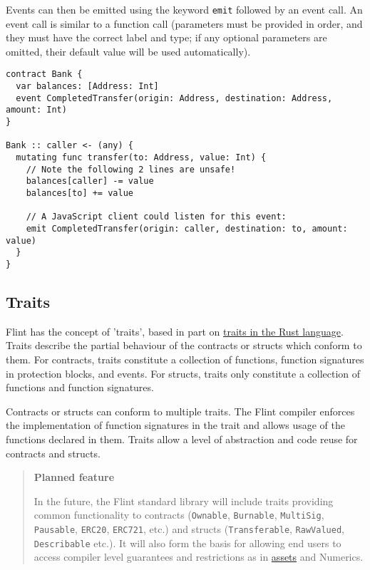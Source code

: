Events can then be emitted using the keyword \texttt{emit} followed by an event call. An event call is similar to a function call (parameters must be provided in order, and they must have the correct label and type; if any optional parameters are omitted, their default value will be used automatically).

\begin{verbatim}
contract Bank {
  var balances: [Address: Int]
  event CompletedTransfer(origin: Address, destination: Address, amount: Int)
}

Bank :: caller <- (any) {
  mutating func transfer(to: Address, value: Int) {
    // Note the following 2 lines are unsafe!
    balances[caller] -= value
    balances[to] += value

    // A JavaScript client could listen for this event:
    emit CompletedTransfer(origin: caller, destination: to, amount: value)
  }
}
\end{verbatim}

\subsection{Traits}
\label{sec:appendix-b-traits}

Flint has the concept of 'traits', based in part on \href{https://doc.rust-lang.org/rust-by-example/trait.html}{traits in the Rust language}. Traits describe the partial behaviour of the contracts or structs which conform to them. For contracts, traits constitute a collection of functions, function signatures in protection blocks, and events. For structs, traits only constitute a collection of functions and function signatures.

Contracts or structs can conform to multiple traits. The Flint compiler enforces the implementation of function signatures in the trait and allows usage of the functions declared in them. Traits allow a level of abstraction and code reuse for contracts and structs.

\begin{quote}
\textbf{Planned feature}

In the future, the Flint standard library will include traits providing common functionality to contracts (\texttt{Ownable}, \texttt{Burnable}, \texttt{MultiSig}, \texttt{Pausable}, \texttt{ERC20}, \texttt{ERC721}, etc.) and structs (\texttt{Transferable}, \texttt{RawValued}, \texttt{Describable} etc.). It will also form the basis for allowing end users to access compiler level guarantees and restrictions as in \hyperref[sec:appendix-b-assets]{assets} and Numerics.
\end{quote}

